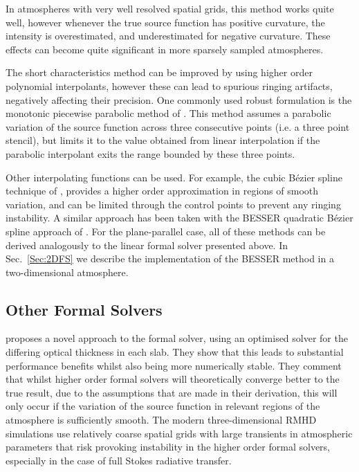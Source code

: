 In atmospheres with very well resolved spatial grids, this method works quite well, however whenever the true source function has positive curvature, the intensity is overestimated, and underestimated for negative curvature. These effects can become quite significant in more sparsely sampled atmospheres.

The short characteristics method can be improved by using higher order polynomial interpolants, however these can lead to spurious ringing artifacts, negatively affecting their precision. One commonly used robust formulation is the monotonic piecewise parabolic method of \citet{Auer1994}. This method assumes a parabolic variation of the source function across three consecutive points (i.e. a three point stencil), but limits it to the value obtained from linear interpolation if the parabolic interpolant exits the range bounded by these three points.

Other interpolating functions can be used. For example, the cubic Bézier spline technique of \citet{DelaCruzRodriguez2013}, provides a higher order approximation in regions of smooth variation, and can be limited through the control points to prevent any ringing instability. A similar approach has been taken with the BESSER quadratic Bézier spline approach of \citet{Stepan2013}.
For the plane-parallel case, all of these methods can be derived analogously to the linear formal solver presented above.
In Sec.~\ref{Sec:2DFS} we describe the implementation of the BESSER method in a two-dimensional atmosphere.

\subsection{Other Formal Solvers}

\citet{Janett2018} proposes a novel approach to the formal solver,  using an optimised solver for the differing optical thickness in each slab. They show that this leads to substantial performance benefits whilst also being more numerically stable. They comment that whilst higher order formal solvers will theoretically converge better to the true result, due to the assumptions that are made in their derivation, this will only occur if the variation of the source function in relevant regions of the atmosphere is sufficiently smooth. The modern three-dimensional RMHD simulations use relatively coarse spatial grids with large transients in atmospheric parameters that risk provoking instability in the higher order formal solvers, especially in the case of full Stokes radiative transfer.

